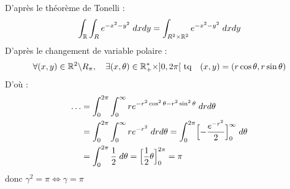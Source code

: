 \begin{example}
    \vspace{0.5cm}
    D'après le théorème de Tonelli :
    \[ \int_{\mathbb{R}} \int_R e^{-x^2-y^2} \; dxdy  = \int_{R^2 \times \mathbb{R}^2} e^{-x^2-y^2} \; dxdy  \] 
    D'après le changement de variable polaire :
    \[ \forall (x,y) \in \mathbb{R}^2 \backslash R_\pi, \quad \exists (x,\theta) \in \mathbb{R}_+^* \times ]0,2\pi[ \text{ tq} \quad (x,y) = (r \cos \theta, r \sin \theta) \]
    D'où : 
    \begin{align*}
        \dots &= \int_{0}^{2\pi} \int_{0}^{\infty} r e^{-r^2 \cos^2 \theta - r^2 \sin^2 \theta} \; dr d\theta \\
            &= \int_{0}^{2\pi} \int_{0}^{\infty} r e^{-r^2} \; dr d \theta = \int_{0}^{2\pi} \Bigl[ - \frac{e^{-r^2}}{2}\Bigr]_0^\infty \; d \theta \\
            &= \int_{0}^{2\pi} \frac{1}{2} \; d \theta = \Bigl[ \frac{1}{2} \theta\Bigr]_0^{2\pi} = \pi 
    \end{align*}
    donc $ \gamma^2 = \pi \Longleftrightarrow \gamma = \pi $
\end{example}

